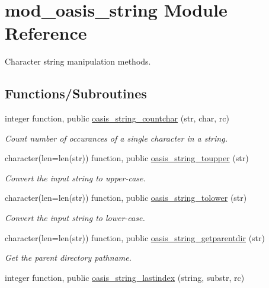 \hypertarget{namespacemod__oasis__string}{}\section{mod\+\_\+oasis\+\_\+string Module Reference}
\label{namespacemod__oasis__string}


Character string manipulation methods.  


\subsection*{Functions/\+Subroutines}
\begin{DoxyCompactItemize}
\item 
integer function, public \hyperlink{namespacemod__oasis__string_a54c5d197eba9bcb7fa7f71b200f8e5e6}{oasis\+\_\+string\+\_\+countchar} (str, char, rc)
\begin{DoxyCompactList}\small\item\em Count number of occurances of a single character in a string. \end{DoxyCompactList}\item 
character(len=len(str)) function, public \hyperlink{namespacemod__oasis__string_a832ff1d26d766bee361ef9669efacda6}{oasis\+\_\+string\+\_\+toupper} (str)
\begin{DoxyCompactList}\small\item\em Convert the input string to upper-\/case. \end{DoxyCompactList}\item 
character(len=len(str)) function, public \hyperlink{namespacemod__oasis__string_af339c54c982092a80960a5241ccae1fa}{oasis\+\_\+string\+\_\+tolower} (str)
\begin{DoxyCompactList}\small\item\em Convert the input string to lower-\/case. \end{DoxyCompactList}\item 
character(len=len(str)) function, public \hyperlink{namespacemod__oasis__string_a8f2289f6a9d1e9940204bbeb82b89f33}{oasis\+\_\+string\+\_\+getparentdir} (str)
\begin{DoxyCompactList}\small\item\em Get the parent directory pathname. \end{DoxyCompactList}\item 
integer function, public \hyperlink{namespacemod__oasis__string_afae0db32f2cf0b6beb00829f8f016e48}{oasis\+\_\+string\+\_\+lastindex} (string, substr, rc)

\end{DoxyCompactItemize}
